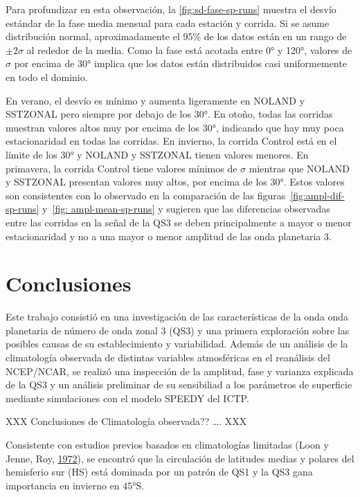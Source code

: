 \documentclass[spanish,a4paper,12pt,oneside]{book}
\begin{document}
Para profundizar en esta observación, la \autoref{fig:sd-fase-sp-runs}
muestra el desvío estándar de la fase media mensual para cada estación y
corrida. Si se asume distribución normal, aproximadamente el 95\% de los
datos están en un rango de \(\pm 2\sigma\) al rededor de la media. Como
la fase está acotada entre 0° y 120°, valores de \(\sigma\) por encima
de 30° implica que los datos están distribuidos casi uniformemente en
todo el dominio.

En verano, el desvío es mínimo y aumenta ligeramente en NOLAND y
SSTZONAL pero siempre por debajo de los 30°. En otoño, todas las
corridas muestran valores altos muy por encima de los 30°, indicando que
hay muy poca estacionaridad en todas las corridas. En invierno, la
corrida Control está en el límite de los 30° y NOLAND y SSTZONAL tienen
valores menores. En primavera, la corrida Control tiene valores mínimos
de \(\sigma\) mientras que NOLAND y SSTZONAL presentan valores muy
altos, por encima de los 30°. Estos valores son consistentes con lo
observado en la comparación de las figuras~\ref{fig:ampl-dif-sp-runs}
y~\ref{fig: ampl-mean-sp-runs} y sugieren que las diferencias observadas
entre las corridas en la señal de la QS3 se deben principalmente a mayor
o menor estacionaridad y no a una mayor o menor amplitud de las onda
planetaria 3.

\chapter{Conclusiones}\label{conclusiones}

Este trabajo consistió en una investigación de las características de la
onda onda planetaria de número de onda zonal 3 (QS3) y una primera
exploración sobre las posibles causas de su establecimiento y
variabilidad. Además de un análisis de la climatología observada de
distintas variables atmosféricas en el reanálisis del NCEP/NCAR, se
realizó una inspección de la amplitud, fase y varianza explicada de la
QS3 y un análisis preliminar de su sensibiliad a los parámetros de
superficie mediante simulaciones con el modelo SPEEDY del ICTP.

XXX Conclusiones de Climatología observada?? \ldots{}. XXX

Consistente con estudios previos basados en climatologías limitadas
(Loon y Jenne, Roy, \protect\hyperlink{ref-Loon1972}{1972}), se encontró
que la circulación de latitudes medias y polares del hemisferio sur (HS)
está dominada por un patrón de QS1 y la QS3 gana importancia en invierno
en 45°S.
\end{document}
